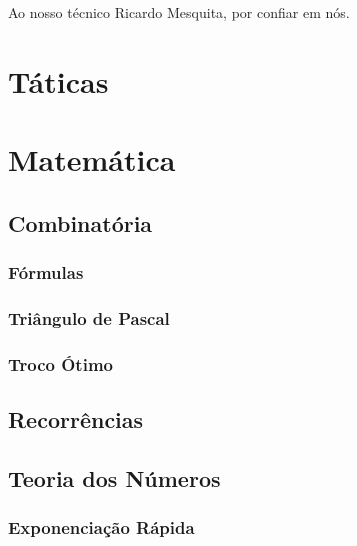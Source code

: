 





\begin{dedication}
\Large{Ao nosso técnico Ricardo Mesquita, por confiar em nós.}
\end{dedication}

\tableofcontents


% 
\chapter{Táticas}

% 
\chapter{Matemática}
    \section{Combinatória}
        \subsection{Fórmulas}
            
        \subsection{Triângulo de Pascal}
            
            \newpage
        \subsection{Troco Ótimo}
            
            \newpage
    \section{Recorrências}
        
        \newpage
    \section{Teoria dos Números}
        \subsection{Exponenciação Rápida}
            
            \newpage
